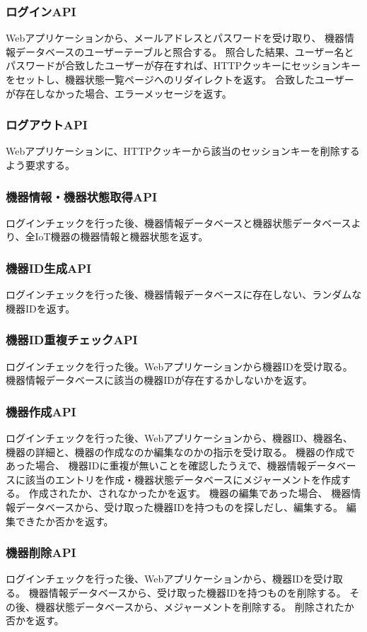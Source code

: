 \subsubsection{ログインAPI}
Webアプリケーションから、メールアドレスとパスワードを受け取り、	機器情報データベースのユーザーテーブルと照合する。
照合した結果、ユーザー名とパスワードが合致したユーザーが存在すれば、HTTPクッキーにセッションキーをセットし、機器状態一覧ページへのリダイレクトを返す。
合致したユーザーが存在しなかった場合、エラーメッセージを返す。
\subsubsection{ログアウトAPI}
Webアプリケーションに、HTTPクッキーから該当のセッションキーを削除するよう要求する。
\subsubsection{機器情報・機器状態取得API}
ログインチェックを行った後、機器情報データベースと機器状態データベースより、全IoT機器の機器情報と機器状態を返す。
\subsubsection{機器ID生成API}
ログインチェックを行った後、機器情報データベースに存在しない、ランダムな機器IDを返す。
\subsubsection{機器ID重複チェックAPI}
ログインチェックを行った後。Webアプリケーションから機器IDを受け取る。
機器情報データベースに該当の機器IDが存在するかしないかを返す。
\subsubsection{機器作成API}
ログインチェックを行った後、Webアプリケーションから、機器ID、機器名、機器の詳細と、機器の作成なのか編集なのかの指示を受け取る。
機器の作成であった場合、
機器IDに重複が無いことを確認したうえで、機器情報データベースに該当のエントリを作成・機器状態データベースにメジャーメントを作成する。
作成されたか、されなかったかを返す。
機器の編集であった場合、
機器情報データベースから、受け取った機器IDを持つものを探しだし、編集する。
編集できたか否かを返す。
\subsubsection{機器削除API}
ログインチェックを行った後、Webアプリケーションから、機器IDを受け取る。
機器情報データベースから、受け取った機器IDを持つものを削除する。
その後、機器状態データベースから、メジャーメントを削除する。
削除されたか否かを返す。
